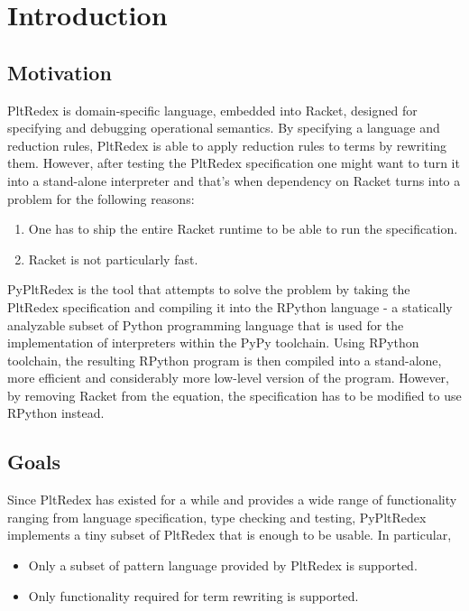 \chapter{Introduction}
\section{Motivation}
PltRedex is domain-specific language, embedded into Racket, designed for specifying and debugging operational semantics. By specifying a language and reduction rules, PltRedex is able to apply reduction rules to terms by rewriting them. 
However, after testing the PltRedex specification one might want to turn it into a stand-alone interpreter and that's when dependency on Racket turns into a problem for the following reasons:

\begin{enumerate}
\item 
One has to ship the entire Racket runtime to be able to run the specification.
\item
Racket is not particularly fast. 
\end{enumerate}

PyPltRedex is the tool that attempts to solve the problem by taking the PltRedex specification and compiling it into the RPython language - a statically analyzable subset of Python programming language that is used for the implementation of interpreters within the PyPy toolchain. Using RPython toolchain, the resulting RPython program is then compiled into a stand-alone, more efficient and considerably more low-level version of the program. However, by removing Racket from the equation, the specification has to be modified to use RPython instead.

\section{Goals}
Since PltRedex has existed for a while and provides a wide range of functionality ranging from language specification, type checking and testing, PyPltRedex implements a tiny subset of PltRedex that is enough to be usable. In particular,

\begin{itemize}
\item Only a subset of pattern language provided by PltRedex is supported.
\item
Only functionality required for term rewriting is supported.
\end{itemize}

